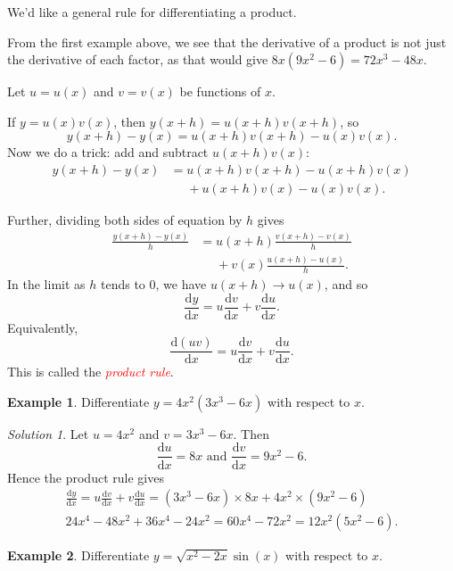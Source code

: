 \documentclass[
  11pt,
  oneside]{book}
\newcommand{\slide}{}
\theoremstyle{definition}
\theoremstyle{definition}
\newtheorem{example}{Example}[chapter]
\theoremstyle{definition}
\theoremstyle{definition}
\theoremstyle{remark}
\newtheorem*{solution}{Solution}
\begin{document}
We'd like a general rule for differentiating a product.

From the first example above, we see that the derivative of a product is not just the derivative of each factor, as
that would give \(8x(9x^2 - 6) = 72x^3 - 48x\).

Let \(u = u(x)\) and \(v = v(x)\) be functions of \(x\).

If \(y = u(x)v(x)\), then \(y(x+h) = u(x+h)v(x+h)\), so
\[y(x+h)-y(x) = u(x+h)v(x+h) - u(x)v(x).\]
Now we do a trick: add and subtract \(u(x+h)v(x)\):
\begin{align*}
y(x+h)-y(x) &= u(x+h)v(x+h) - u(x+h)v(x)\\
    &\phantom{=} + u(x+h)v(x) - u(x)v(x).
\end{align*}
\slide
Further, dividing both sides of equation by \(h\) gives
\begin{align*}
\frac{y(x+h)-y(x)}{h} &= u(x+h)\frac{v(x+h) - v(x)}{h} \\
 &\phantom{=} + v(x)\frac{u(x+h ) - u(x)}{h}.
\end{align*}
In the limit as \(h\) tends to \(0\), we have \(u(x+h)\to u(x)\), and so
\[ 
\frac{\mathrm{d} y}{\mathrm{d} x} = u\frac{\mathrm{d} v}{\mathrm{d} x} + v\frac{\mathrm{d} u}{\mathrm{d} x}.
\]
Equivalently,
\[ 
\frac{\mathrm{d}(uv)}{\mathrm{d} x} = u\frac{\mathrm{d} v}{\mathrm{d} x} + v\frac{\mathrm{d} u}{\mathrm{d} x}.
\]
This is called the \textcolor{red}{\em product rule}.
\slide

\begin{example}
Differentiate \(y=4x^2(3x^3-6x)\) with respect to \(x\).
\end{example}

\begin{solution}
Let \(u = 4x^2\) and \(v = 3x^3-6x\). Then
\[
\frac{\mathrm{d} u}{\mathrm{d} x} = 8x\text{ and }\frac{\mathrm{d} v}{\mathrm{d} x} = 9x^2-6.
\]
Hence the product rule gives
\begin{gather*}
\frac{\mathrm{d} y}{\mathrm{d} x} = u\frac{\mathrm{d} v}{\mathrm{d} x} + v\frac{\mathrm{d} u}{\mathrm{d} x} = (3x^3-6x)\times 8x + 4x^2\times(9x^2-6)\\
24x^4 - 48x^2 + 36x^4-24x^2 = 60x^4-72x^2 = 12x^2(5x^2-6).
\end{gather*}
\end{solution}

\slide

\begin{example}
Differentiate \(y=\sqrt{x^2-2x}\sin(x)\) with respect to \(x\).
\end{example}
\end{document}
